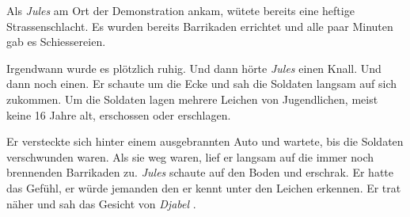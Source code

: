 \documentclass{article}
\def \nameone {\textit{Jules} }
\def \nametwo {\textit{Djabel} }
\begin{document}
		Als \nameone am Ort der Demonstration ankam, wütete bereits eine heftige Strassenschlacht. Es wurden bereits Barrikaden errichtet und alle paar Minuten gab es Schiessereien. 
		
		Irgendwann wurde es plötzlich ruhig. Und dann hörte \nameone einen Knall. Und dann noch einen. Er schaute um die Ecke und sah die Soldaten langsam auf sich zukommen. Um die Soldaten lagen mehrere Leichen von Jugendlichen, meist keine 16 Jahre alt, erschossen oder erschlagen.
		
		Er versteckte sich hinter einem ausgebrannten Auto und wartete, bis die Soldaten verschwunden waren. Als sie weg waren, lief er langsam auf die immer noch brennenden Barrikaden zu. \nameone schaute auf den Boden und erschrak. Er hatte das Gefühl, er würde jemanden den er kennt unter den Leichen erkennen. Er trat näher und sah das Gesicht von \nametwo. 
		
		
		
	
\end{document}
